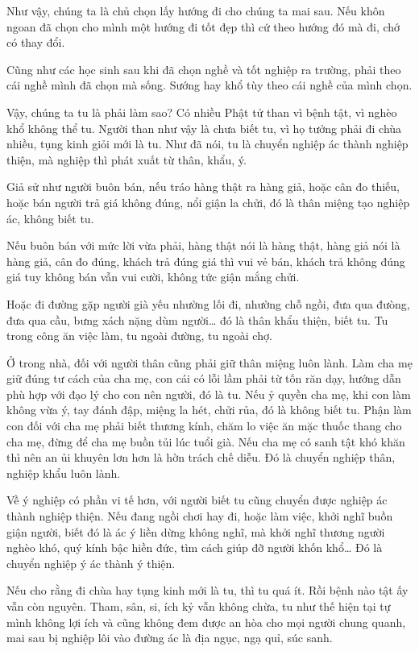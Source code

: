 \documentclass[
  12pt,
  oneside]{book}
\begin{document}
Như vậy, chúng ta là chủ chọn lấy hướng đi cho chúng ta mai sau. Nếu khôn ngoan đã chọn cho mình một hướng đi tốt đẹp thì cứ theo hướng đó mà đi, chớ có thay đổi.

Cũng như các học sinh sau khi đã chọn nghề và tốt nghiệp ra trường, phải theo cái nghề mình đã chọn mà sống. Sướng hay khổ tùy theo cái nghề của mình chọn.

Vậy, chúng ta tu là phải làm sao? Có nhiều Phật tử than vì bệnh tật, vì nghèo khổ không thể tu. Người than như vậy là chưa biết tu, vì họ tưởng phải đi chùa nhiều, tụng kinh giỏi mới là tu. Như đã nói, tu là chuyển nghiệp ác thành nghiệp thiện, mà nghiệp thì phát xuất từ thân, khẩu, ý.

Giả sử như người buôn bán, nếu tráo hàng thật ra hàng giả, hoặc cân đo thiếu, hoặc bán người trả giá không đúng, nổi giận la chửi, đó là thân miệng tạo nghiệp ác, không biết tu.

Nếu buôn bán với mức lời vừa phải, hàng thật nói là hàng thật, hàng giả nói là hàng giả, cân đo đúng, khách trả đúng giá thì vui vẻ bán, khách trả không đúng giá tuy không bán vẫn vui cười, không tức giận mắng chửi.

Hoặc đi đường gặp người già yếu nhường lối đi, nhường chỗ ngồi, đưa qua đưòng, đưa qua cầu, bưng xách nặng dùm người\ldots{} đó là thân khẩu thiện, biết tu. Tu trong công ăn việc làm, tu ngoài đường, tu ngoài chợ.

Ở trong nhà, đối với người thân cũng phải giữ thân miệng luôn lành. Làm cha mẹ giữ đúng tư cách của cha mẹ, con cái có lỗi lầm phải từ tốn răn dạy, hướng dẫn phù hợp với đạo lý cho con nên người, đó là tu. Nếu ỷ quyền cha mẹ, khi con làm không vừa ý, tay đánh đập, miệng la hét, chửi rủa, đó là không biết tu. Phận làm con đối với cha mẹ phải biết thương kính, chăm lo việc ăn mặc thuốc thang cho cha mẹ, đừng để cha mẹ buồn tủi lúc tuổi già. Nếu cha mẹ có sanh tật khó khăn thì nên an ủi khuyên lơn hơn là hờn trách chế diễu. Đó là chuyển nghiệp thân, nghiệp khẩu luôn lành.

Về ý nghiệp có phần vi tế hơn, với người biết tu cũng chuyển được nghiệp ác thành nghiệp thiện. Nếu đang ngồi chơi hay đi, hoặc làm việc, khởi nghĩ buồn giận người, biết đó là ác ý liền dừng không nghĩ, mà khởi nghĩ thương người nghèo khó, quý kính bậc hiền đức, tìm cách giúp đỡ người khốn khổ\ldots{} Đó là chuyển nghiệp ý ác thành ý thiện.

Nếu cho rằng đi chùa hay tụng kinh mới là tu, thì tu quá ít. Rồi bệnh nào tật ấy vẫn còn nguyên. Tham, sân, si, ích kỷ vẫn không chừa, tu như thế hiện tại tự mình không lợi ích và cũng không đem được an hòa cho mọi người chung quanh, mai sau bị nghiệp lôi vào đường ác là địa ngục, ngạ quỉ, súc sanh.
\end{document}
